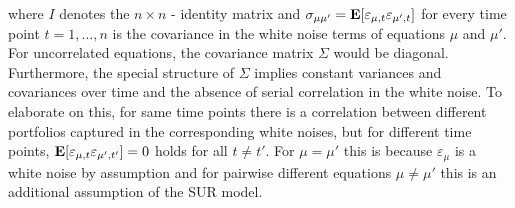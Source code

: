 \documentclass[a4paper, 12pt]{scrreprt}
\newcommand{\ew}{\mbox{\textbf{E}}}
\begin{document}
where $I$ denotes the $n \times n$ - identity matrix and $\sigma_{\mu \mu'} = \ew[\varepsilon_{\mu,t} \varepsilon_{\mu',t}]$ for every time point $t=1,\ldots,n$ is the covariance in the white noise terms of equations $\mu$ and $\mu'$. For uncorrelated equations, the covariance matrix $\Sigma$ would be diagonal.
Furthermore, the special structure of $\Sigma$ implies constant variances and covariances over time and the absence of serial correlation in the white noise. To elaborate on this, for same time points there is a correlation between different portfolios captured in the corresponding white noises, but for different time points, 
$\ew[\varepsilon_{\mu,t} \varepsilon_{\mu',t'}] =0$ holds for all $t\neq t'$. For $\mu = \mu'$ this is because $\varepsilon_{\mu}$ is a white noise by assumption and for pairwise different equations $\mu \neq \mu'$ this is an additional assumption of the SUR model.
\end{document}
